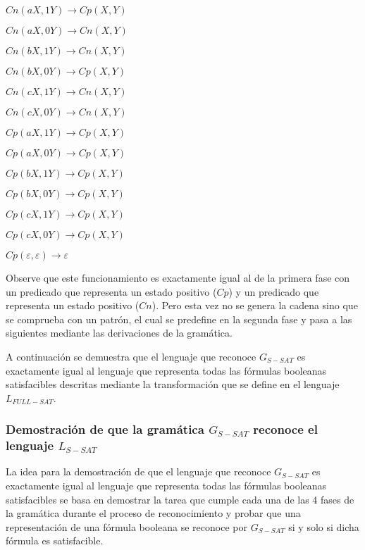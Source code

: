 \documentclass[12pt]{article}
\begin{document}
\begin{itemize}
\begin{enumerate}[start=23]
\begin{multicols}{2}
                  \item $Cn(aX,1Y) \to Cp(X,Y)$
                  \item $Cn(aX,0Y) \to Cn(X,Y)$
                  \item $Cn(bX,1Y) \to Cn(X,Y)$
                  \item $Cn(bX,0Y) \to Cp(X,Y)$
                  \item $Cn(cX,1Y) \to Cn(X,Y)$
                  \item $Cn(cX,0Y) \to Cn(X,Y)$

                  \item $Cp(aX,1Y) \to Cp(X,Y)$
                  \item $Cp(aX,0Y) \to Cp(X,Y)$
                  \item $Cp(bX,1Y) \to Cp(X,Y)$
                  \item $Cp(bX,0Y) \to Cp(X,Y)$
                  \item $Cp(cX,1Y) \to Cp(X,Y)$
                  \item $Cp(cX,0Y) \to Cp(X,Y)$
                  \item $Cp(\varepsilon,\varepsilon)\to \varepsilon$
              \end{multicols}
          \end{enumerate}

          Observe que este funcionamiento es exactamente igual al de la primera fase con un predicado que representa un
          estado positivo ($Cp$) y un predicado que representa un estado positivo ($Cn$). Pero esta vez no se genera
          la cadena sino que se comprueba con un patrón, el cual se predefine en la segunda fase y pasa a las
          siguientes mediante las derivaciones de la gramática.

\end{itemize}

A continuación se demuestra que el lenguaje que reconoce $G_{S-SAT}$ es exactamente igual al lenguaje que
representa todas las fórmulas booleanas satisfacibles descritas mediante la transformación que se define
en el lenguaje $L_{FULL-SAT}$.

\subsubsection{Demostración de que la gramática $G_{S-SAT}$ reconoce el lenguaje $L_{S-SAT}$}

La idea para la demostración de que el lenguaje que reconoce $G_{S-SAT}$ es exactamente igual al lenguaje que
representa todas las fórmulas booleanas satisfacibles se basa en demostrar la tarea que cumple cada una de las 4 fases de la gramática
durante el proceso de reconocimiento y probar que una representación de una fórmula booleana
se reconoce por $G_{S-SAT}$ si y solo si dicha fórmula es satisfacible.
\end{document}
